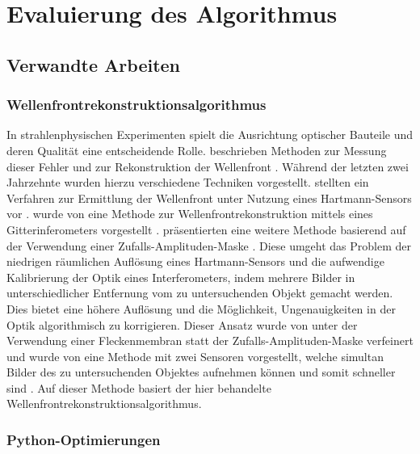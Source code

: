 \chapter{Evaluierung des Algorithmus}

\section{Verwandte Arbeiten}

\subsection{Wellenfrontrekonstruktionsalgorithmus}

In strahlenphysischen Experimenten spielt die Ausrichtung optischer Bauteile und deren Qualität eine entscheidende Rolle. \citeauthor{GNS+11} beschrieben \citeyear{GNS+11} Methoden zur Messung dieser Fehler und zur Rekonstruktion der Wellenfront \cite{GNS+11}.
Während der letzten zwei Jahrzehnte wurden hierzu verschiedene Techniken vorgestellt. \citeauthor{MZI+03} stellten \citeyear{MZI+03} ein Verfahren zur Ermittlung der Wellenfront unter Nutzung eines Hartmann-Sensors vor \cite{MZI+03}. \citeyear{WND+05} wurde von \citeauthor{WND+05} eine Methode zur Wellenfrontrekonstruktion mittels eines Gitterinferometers vorgestellt \cite{WND+05}. \citeauthor{APO+07} präsentierten \citeyear{APO+07} eine weitere Methode basierend auf der Verwendung einer Zufalls-Amplituden-Maske \cite{APO+07}. Diese umgeht das Problem der niedrigen räumlichen Auflösung eines Hartmann-Sensors und die aufwendige Kalibrierung der Optik eines Interferometers, indem mehrere Bilder in unterschiedlicher Entfernung vom zu untersuchenden Objekt gemacht werden. Dies bietet eine höhere Auflösung und die Möglichkeit, Ungenauigkeiten in der Optik algorithmisch zu korrigieren. Dieser Ansatz wurde \citeyear{Ber12} von \citeauthor{Ber12} unter der Verwendung einer Fleckenmembran statt der Zufalls-Amplituden-Maske verfeinert und \citeyear{Ber13} wurde von \citeauthor{Ber13} eine Methode mit zwei Sensoren vorgestellt, welche simultan Bilder des zu untersuchenden Objektes aufnehmen können und somit schneller sind \cite{Ber13}. Auf dieser Methode basiert der hier behandelte Wellenfrontrekonstruktionsalgorithmus. 

\subsection{Python-Optimierungen}

